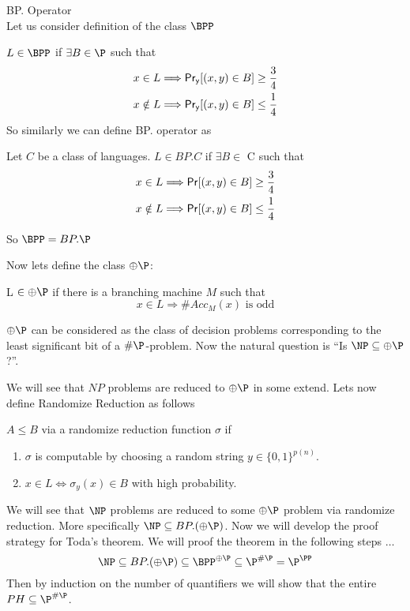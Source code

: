 \documentclass[11pt]{article}
\begin{document}
\begin{definition}
BP. Operator \\
Let us consider definition of the class $\BPP$ 

$L \in \BPP$ if $\exists B \in \P$ such that 
\begin{align*}
x \in L & \Longrightarrow {\sf Pr_y}[(x,y) \in B ] \ge \frac{3}{4} \\
x \notin L & \Longrightarrow {\sf Pr_y}[(x,y) \in B] \le \frac{1}{4}
\end{align*}
So similarly we can define BP. operator as 


\begin{center}
Let $C$ be a class of languages. 
$L \in BP.C$ if $ \exists B \in$ C such that
\begin{align*}
x \in L & \Longrightarrow {\sf Pr}[(x,y) \in B]  \ge \frac{3}{4}\\
x \notin L & \Longrightarrow {\sf Pr}[(x,y) \in B] \le \frac{1}{4}
\end{align*}
\end{center}
So $\BPP = BP.\P$
\end{definition}

Now lets define the class $\oplus \P$:
\begin{definition}
L $\in \oplus \P$ if there is a branching machine $M$ such that
\[ x \in L \Longrightarrow \#Acc_M(x) \text{ is odd} \]
\end{definition}

$\oplus\P$ can be considered as the class of decision problems corresponding 
to the least significant bit of a $\#\P$-problem. Now the natural 
question is ``Is $\NP \subseteq \oplus\P$?''.

We will see that $NP$ problems are reduced to $\oplus\P$ in some extend.
Lets now define Randomize Reduction as follows
\begin{definition}
$A \le B$ via a randomize reduction function $\sigma$ if 
\begin{enumerate}
\item  $\sigma$ is computable by choosing a random string 
$y \in \{0,1\}^{p(n)}$.
\item $x \in L \iff \sigma_y(x) \in B$ with high probability.
\end{enumerate}
\end{definition}

We will see that $\NP$ problems are reduced to some $\oplus\P$ problem 
via randomize reduction. More specifically $\NP \subseteq BP.(\oplus \P)$.
Now we will develop the proof strategy for Toda's theorem. 
We will proof the theorem in the following steps $\ldots$ 
\[
\NP \subseteq BP.(\oplus \P) \subseteq \BPP^{\oplus \P} \subseteq 
\P^{\#\P}=\P^{\PP} \]
Then by induction on the number of quantifiers we will show that the 
entire $PH \subseteq \P^{\#\P}$.
\end{document}
